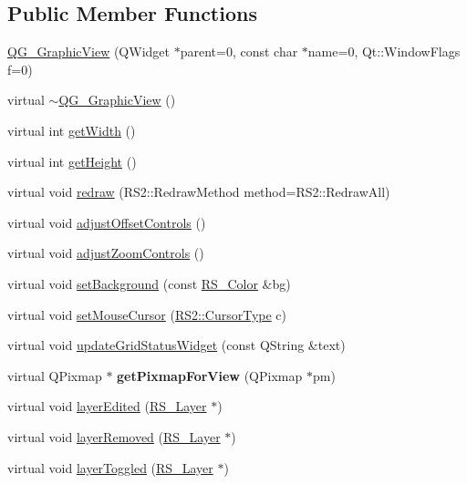 \subsection*{Public Member Functions}
\begin{DoxyCompactItemize}
\item 
\hyperlink{classQG__GraphicView_a229303fce011cd2664307ac66887f592}{Q\-G\-\_\-\-Graphic\-View} (Q\-Widget $\ast$parent=0, const char $\ast$name=0, Qt\-::\-Window\-Flags f=0)
\item 
virtual \hyperlink{classQG__GraphicView_a9e8e30f3dc65bf276dd9c3d20832c89f}{$\sim$\-Q\-G\-\_\-\-Graphic\-View} ()
\item 
virtual int \hyperlink{classQG__GraphicView_a7763c2274da1cc4c964a064f6595df53}{get\-Width} ()
\item 
virtual int \hyperlink{classQG__GraphicView_a846f60b49fabe8d3e22663ce2619d9ff}{get\-Height} ()
\item 
virtual void \hyperlink{classQG__GraphicView_a8a9673c2f8fab64ba6a46a7cd25d01a6}{redraw} (R\-S2\-::\-Redraw\-Method method=R\-S2\-::\-Redraw\-All)
\item 
virtual void \hyperlink{classQG__GraphicView_af5daff2a755bb12153aaf81c4758915b}{adjust\-Offset\-Controls} ()
\item 
virtual void \hyperlink{classQG__GraphicView_a2693ff4efac620095283911f70eb4c1f}{adjust\-Zoom\-Controls} ()
\item 
virtual void \hyperlink{classQG__GraphicView_add6e514c83ef1e6a331bbeb0b471a113}{set\-Background} (const \hyperlink{classRS__Color}{R\-S\-\_\-\-Color} \&bg)
\item 
virtual void \hyperlink{classQG__GraphicView_a92777e4afa5a4a9b8e2bf7164ae5183c}{set\-Mouse\-Cursor} (\hyperlink{classRS2_a15aa1c4c60c63de4dc688f0bcb43548d}{R\-S2\-::\-Cursor\-Type} c)
\item 
virtual void \hyperlink{classQG__GraphicView_ae29b55c26a59816a419facdf038b0cf1}{update\-Grid\-Status\-Widget} (const Q\-String \&text)
\item 
\hypertarget{classQG__GraphicView_a11fda447f1014df028c20e2fb156abd6}{virtual Q\-Pixmap $\ast$ {\bfseries get\-Pixmap\-For\-View} (Q\-Pixmap $\ast$pm)}\label{classQG__GraphicView_a11fda447f1014df028c20e2fb156abd6}

\item 
virtual void \hyperlink{classQG__GraphicView_aed4216bc22167b95c85449216fb65ae7}{layer\-Edited} (\hyperlink{classRS__Layer}{R\-S\-\_\-\-Layer} $\ast$)
\item 
virtual void \hyperlink{classQG__GraphicView_a6d7ba9e543d82b5c58db6879f2b8139f}{layer\-Removed} (\hyperlink{classRS__Layer}{R\-S\-\_\-\-Layer} $\ast$)
\item 
virtual void \hyperlink{classQG__GraphicView_a04fce7c5a094ee5e2c85efc1d4d6bf3c}{layer\-Toggled} (\hyperlink{classRS__Layer}{R\-S\-\_\-\-Layer} $\ast$)
\end{DoxyCompactItemize}
